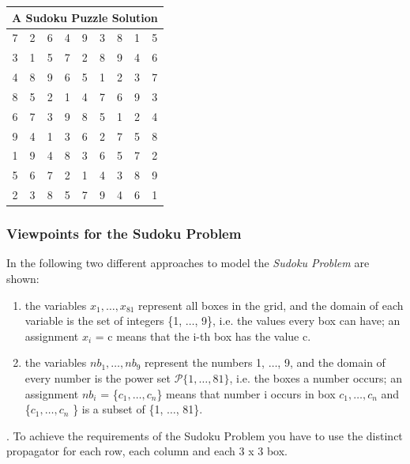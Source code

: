 \documentclass[a4paper,halfparskip]{scrartcl}
\begin{document}
\begin{tabular}{||c|c|c||c|c|c||c|c|c||}
\hline
\multicolumn{9}{||c||}{A Sudoku Puzzle Solution \label{sudoku-sol}}\\
\hline
\hline
7 & 2 & 6 & 4 & 9 & 3 & 8 & 1 & 5\\
\hline
3 & 1 & 5 & 7 & 2 & 8 & 9 & 4 & 6\\
\hline
4 & 8 & 9 & 6 & 5 & 1 & 2 & 3 & 7\\
\hline
\hline
8 & 5 & 2 & 1 & 4 & 7 & 6 & 9 & 3\\
\hline
6 & 7 & 3 & 9 & 8 & 5 & 1 & 2 & 4\\
\hline
9 & 4 & 1 & 3 & 6 & 2 & 7 & 5 & 8\\
\hline
\hline
1 & 9 & 4 & 8 & 3 & 6 & 5 & 7 & 2\\
\hline
5 & 6 & 7 & 2 & 1 & 4 & 3 & 8 & 9\\
\hline
2 & 3 & 8 & 5 & 7 & 9 & 4 & 6 & 1\\
\hline   
\end{tabular}

\subsubsection{Viewpoints for the Sudoku Problem}
In the following two different approaches to model
the \emph{Sudoku Problem} are shown:
\begin{enumerate}
\item
the variables $x_1, \ldots, x_{81}$ represent all boxes
in the grid, and the domain of each variable is the set
of integers \{1, $\ldots$, 9\}, i.e. the values every box
can have; an assignment $x_i$ = c means that the i-th box
has the value c.
\item
the variables $\mathit{nb}_1, \ldots, \mathit{nb}_9$ represent the numbers
1, $\ldots$, 9, and the domain of every number is the power set
$\mathcal{P}\{1, \dots, 81\}$, i.e. the boxes a number occurs; an
assignment $\mathit{nb}_i$ = \{$c_1, \ldots, c_n $\} means that number i occurs
in box $c_1, \ldots, c_n$ and \{$c_1, \ldots, c_n $ \} is a subset of 
\{1, $\ldots$, 81\}.
\end{enumerate}
. 
To achieve the requirements of the Sudoku Problem you have to
use the distinct propagator for each row, each column and each
3 x 3 box.
\end{document}
